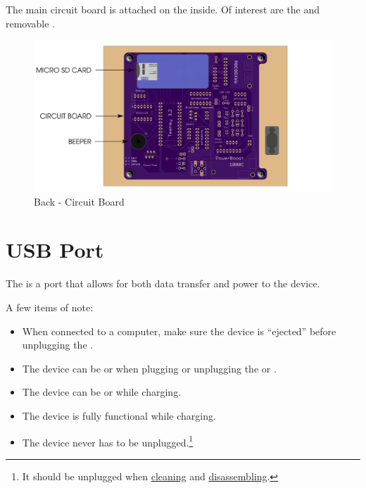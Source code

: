 The main circuit board is attached on the inside.  Of interest are
the  and removable .

\begin{figure}[H]
\centering
  \includegraphics{images/back_circuit_board.png}
\caption{Back - Circuit Board}
\end{figure}

\section{USB Port} \label{USB Port}

The  is a  port that allows for both data transfer and power
to the device.

\par\medskip

A few items of note:

\begin{itemize}
  \item When connected to a computer, make sure the device is ``ejected'' before
    unplugging the \hyperref[USB Cable]{}.
  \item The device can be  or  when plugging or unplugging the
    \hyperref[Power Adapter]{} or \hyperref[USB Cable]{}.
  \item The device can be  or  while charging.
  \item The device is fully functional while charging.
  \item The device never has to be unplugged.\footnote{ It should be unplugged
    when \hyperref[Cleaning]{cleaning} and
    \hyperref[Disassembly]{disassembling}.}
\end{itemize}

